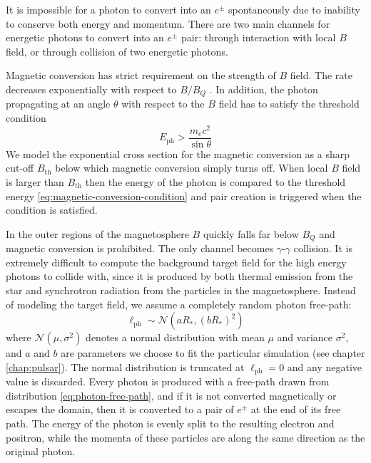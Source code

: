 It is impossible for a photon to convert into an $e^{\pm}$ spontaneously due to
inability to conserve both energy and momentum. There are two main channels for
energetic photons to convert into an $e^{\pm}$ pair: through interaction with
local $B$ field, or through collision of two energetic photons.

Magnetic conversion has strict requirement on the strength of $B$ field. The
rate decreases exponentially with respect to $B/B_{Q}$
\citep{erber_high-energy_1966}. In addition, the photon propagating at an angle
$\theta$ with respect to the $B$ field has to satisfy the threshold condition
\begin{equation}
  \label{eq:magnetic-conversion-condition}
  E_\mathrm{ph} > \frac{m_{e}c^2}{\sin\theta}
\end{equation}
We model the exponential cross section for the magnetic conversion as a sharp
cut-off $B_\mathrm{th}$ below which magnetic conversion simply turns off. When
local $B$ field is larger than $B_\mathrm{th}$ then the energy of the photon is
compared to the threshold energy \eqref{eq:magnetic-conversion-condition} and
pair creation is triggered when the condition is satisfied.

In the outer regions of the magnetosphere $B$ quickly falls far below $B_{Q}$
and magnetic conversion is prohibited. The only channel becomes
$\gamma$-$\gamma$ collision. It is extremely difficult to compute the background
target field for the high energy photons to collide with, since it is produced
by both thermal emission from the star and synchrotron radiation from the
particles in the magnetosphere. Instead of modeling the target field, we assume
a completely random photon free-path:
\begin{equation}
  \label{eq:photon-free-path}
  \ell_\mathrm{ph} \sim \mathcal{N}(aR_{*}, (bR_{*})^2)
\end{equation}
where $\mathcal{N}(\mu, \sigma^2)$ denotes a normal distribution with mean $\mu$
and variance $\sigma^2$, and $a$ and $b$ are parameters we choose to fit the
particular simulation (see chapter \ref{chap:pulsar}). The normal distribution
is truncated at $\ell_\mathrm{ph} = 0$ and any negative value is discarded.
Every photon is produced with a free-path drawn from distribution
\ref{eq:photon-free-path}, and if it is not converted magnetically or escapes
the domain, then it is converted to a pair of $e^{\pm}$ at the end of its free
path. The energy of the photon is evenly split to the resulting electron and
positron, while the momenta of these particles are along the same direction as
the original photon.

